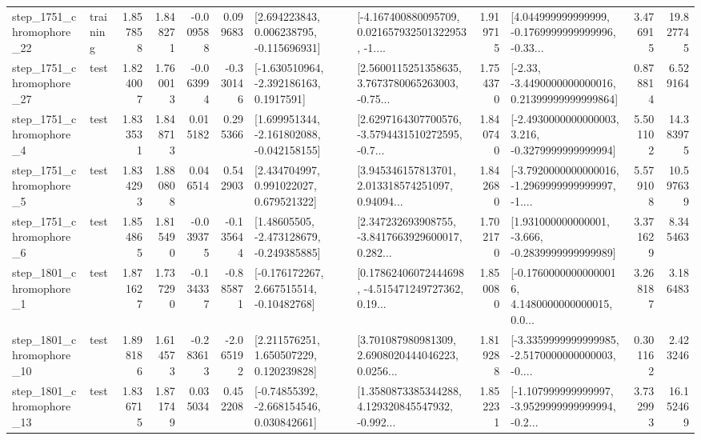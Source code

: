 \begin{tabular}{llrrrrllrlrr}
 step\_1751\_chromophore\_22 &  training &      1.857858 &    1.848271 &     -0.009588 &  0.099683 &    [2.694223843, 0.006238795, -0.115696931] &  [-4.167400880095709, 0.021657932501322953, -1.... &       1.919715 &  [4.044999999999999, -0.1769999999999996, -0.33... &            3.476915 &         19.827745 \\
 step\_1751\_chromophore\_27 &      test &      1.824007 &    1.760013 &     -0.063994 & -0.330146 &     [-1.630510964, -2.392186163, 0.1917591] &  [2.5600115251358635, 3.7673780065263003, -0.75... &       1.754370 &  [-2.33, -3.4490000000000016, 0.21399999999999864] &            0.878814 &          6.529164 \\
  step\_1751\_chromophore\_4 &      test &      1.833531 &    1.848713 &      0.015182 &  0.295366 &   [1.699951344, -2.161802088, -0.042158155] &  [2.6297164307700576, -3.5794431510272595, -0.7... &       1.840740 &  [-2.4930000000000003, 3.216, -0.3279999999999994] &            5.501102 &         14.383975 \\
  step\_1751\_chromophore\_5 &      test &      1.834293 &    1.880808 &      0.046514 &  0.542903 &     [2.434704997, 0.991022027, 0.679521322] &  [3.945346157813701, 2.013318574251097, 0.94094... &       1.842680 &  [-3.7920000000000016, -1.2969999999999997, -1.... &            5.579108 &         10.597639 \\
  step\_1751\_chromophore\_6 &      test &      1.854865 &    1.815490 &     -0.039375 & -0.135644 &    [1.48605505, -2.473128679, -0.249385885] &  [2.347232693908755, -3.8417663929600017, 0.282... &       1.702170 &   [1.931000000000001, -3.666, -0.2839999999999989] &            3.371629 &          8.345463 \\
  step\_1801\_chromophore\_1 &      test &      1.871627 &    1.737290 &     -0.134337 & -0.885871 &    [-0.176172267, 2.667515514, -0.10482768] &  [0.17862406072444698, -4.515471249727362, 0.19... &       1.850080 &  [-0.17600000000000016, 4.1480000000000015, 0.0... &            3.268187 &          3.186483 \\
 step\_1801\_chromophore\_10 &      test &      1.898186 &    1.614573 &     -0.283613 & -2.065192 &     [2.211576251, 1.650507229, 0.120239828] &  [3.701087980981309, 2.6908020444046223, 0.0256... &       1.819288 &  [-3.3359999999999985, -2.5170000000000003, -0.... &            0.301162 &          2.423246 \\
 step\_1801\_chromophore\_13 &      test &      1.836715 &    1.871749 &      0.035034 &  0.452208 &    [-0.74855392, -2.668154546, 0.030842661] &  [1.3580873385344288, 4.129320845547932, -0.992... &       1.852231 &  [-1.107999999999997, -3.9529999999999994, -0.2... &            3.732993 &         16.152469 \\

\end{tabular}
